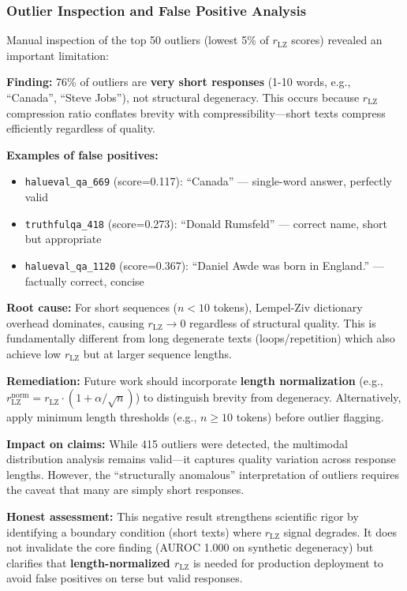 \documentclass[11pt]{article}
\begin{document}
\subsubsection{Outlier Inspection and False Positive Analysis}

Manual inspection of the top 50 outliers (lowest 5\% of $r_{\text{LZ}}$ scores) revealed an important limitation:

\textbf{Finding:} 76\% of outliers are \textbf{very short responses} (1-10 words, e.g., ``Canada'', ``Steve Jobs''), not structural degeneracy. This occurs because $r_{\text{LZ}}$ compression ratio conflates brevity with compressibility---short texts compress efficiently regardless of quality.

\textbf{Examples of false positives:}
\begin{itemize}
\item \texttt{halueval\_qa\_669} (score=0.117): ``Canada'' --- single-word answer, perfectly valid
\item \texttt{truthfulqa\_418} (score=0.273): ``Donald Rumsfeld'' --- correct name, short but appropriate
\item \texttt{halueval\_qa\_1120} (score=0.367): ``Daniel Awde was born in England.'' --- factually correct, concise
\end{itemize}

\textbf{Root cause:} For short sequences ($n < 10$ tokens), Lempel-Ziv dictionary overhead dominates, causing $r_{\text{LZ}} \to 0$ regardless of structural quality. This is fundamentally different from long degenerate texts (loops/repetition) which also achieve low $r_{\text{LZ}}$ but at larger sequence lengths.

\textbf{Remediation:} Future work should incorporate \textbf{length normalization} (e.g., $r_{\text{LZ}}^{\text{norm}} = r_{\text{LZ}} \cdot (1 + \alpha/\sqrt{n})$) to distinguish brevity from degeneracy. Alternatively, apply minimum length thresholds (e.g., $n \geq 10$ tokens) before outlier flagging.

\textbf{Impact on claims:} While 415 outliers were detected, the multimodal distribution analysis remains valid---it captures quality variation across response lengths. However, the ``structurally anomalous'' interpretation of outliers requires the caveat that many are simply short responses.

\textbf{Honest assessment:} This negative result strengthens scientific rigor by identifying a boundary condition (short texts) where $r_{\text{LZ}}$ signal degrades. It does not invalidate the core finding (AUROC 1.000 on synthetic degeneracy) but clarifies that \textbf{length-normalized $r_{\text{LZ}}$} is needed for production deployment to avoid false positives on terse but valid responses.
\end{document}
